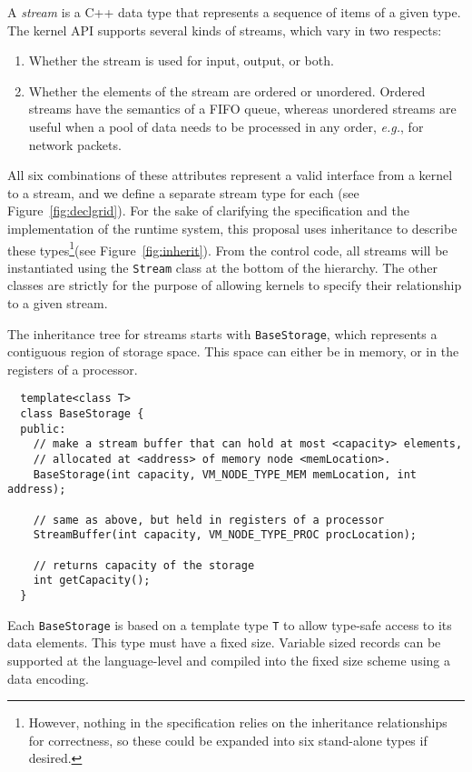A {\it stream} is a C++ data type that represents a sequence of items
of a given type.  The kernel API supports several kinds of streams,
which vary in two respects: 
\begin{enumerate}

\item Whether the stream is used for input, output, or both.

\item Whether the elements of the stream are ordered or unordered.
Ordered streams have the semantics of a FIFO queue, whereas unordered
streams are useful when a pool of data needs to be processed in any
order, {\it e.g.}, for network packets.

\end{enumerate}
All six combinations of these attributes represent a valid interface
from a kernel to a stream, and we define a separate stream type for
each (see Figure~\ref{fig:declgrid}).  For the sake of clarifying the
specification and the implementation of the runtime system, this
proposal uses inheritance to describe these types\footnote{However,
nothing in the specification relies on the inheritance relationships
for correctness, so these could be expanded into six stand-alone types
if desired.}(see Figure~\ref{fig:inherit}).  From the control code,
all streams will be instantiated using the {\tt Stream} class at the
bottom of the hierarchy.  The other classes are strictly for the
purpose of allowing kernels to specify their relationship to a given
stream.

The inheritance tree for streams starts with {\tt BaseStorage}, which
represents a contiguous region of storage space.  This space can
either be in memory, or in the registers of a processor.  {\small
\begin{verbatim}
  template<class T>
  class BaseStorage {
  public:
    // make a stream buffer that can hold at most <capacity> elements,
    // allocated at <address> of memory node <memLocation>.
    BaseStorage(int capacity, VM_NODE_TYPE_MEM memLocation, int address);

    // same as above, but held in registers of a processor
    StreamBuffer(int capacity, VM_NODE_TYPE_PROC procLocation);

    // returns capacity of the storage
    int getCapacity();
  }
\end{verbatim}}

Each {\tt BaseStorage} is based on a template type {\tt T} to allow
type-safe access to its data elements.  This type must have a fixed
size.  Variable sized records can be supported at the language-level
and compiled into the fixed size scheme using a data encoding.

